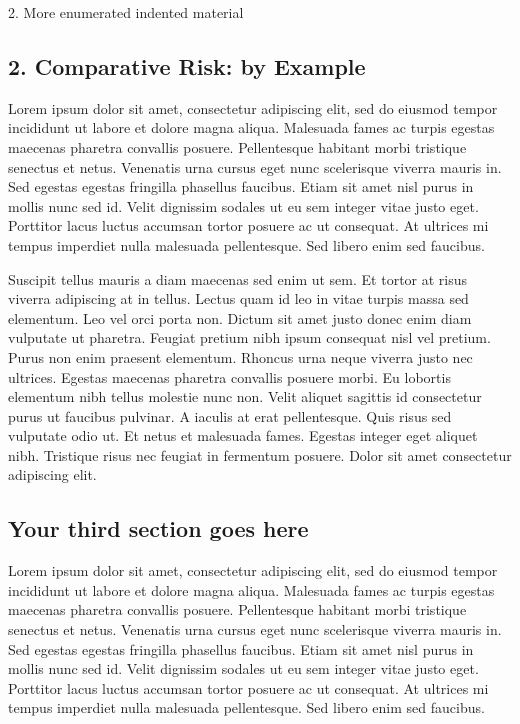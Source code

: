 \documentclass[10pt,oneside,a4paper]{article}
\begin{document}
\begin{multicols}{2}
\begin{description}
\item 2. More enumerated indented material
\end{description}




\subsection*{2. Comparative Risk: by Example}


Lorem ipsum dolor sit amet, consectetur adipiscing elit, sed do eiusmod tempor incididunt ut labore et dolore magna aliqua. Malesuada fames ac turpis egestas maecenas pharetra convallis posuere. Pellentesque habitant morbi tristique senectus et netus. Venenatis urna cursus eget nunc scelerisque viverra mauris in. Sed egestas egestas fringilla phasellus faucibus. Etiam sit amet nisl purus in mollis nunc sed id. Velit dignissim sodales ut eu sem integer vitae justo eget. Porttitor lacus luctus accumsan tortor posuere ac ut consequat. At ultrices mi tempus imperdiet nulla malesuada pellentesque. Sed libero enim sed faucibus.

Suscipit tellus mauris a diam maecenas sed enim ut sem. Et tortor at risus viverra adipiscing at in tellus. Lectus quam id leo in vitae turpis massa sed elementum. Leo vel orci porta non. Dictum sit amet justo donec enim diam vulputate ut pharetra. Feugiat pretium nibh ipsum consequat nisl vel pretium. Purus non enim praesent elementum. Rhoncus urna neque viverra justo nec ultrices. Egestas maecenas pharetra convallis posuere morbi. Eu lobortis elementum nibh tellus molestie nunc non. Velit aliquet sagittis id consectetur purus ut faucibus pulvinar. A iaculis at erat pellentesque. Quis risus sed vulputate odio ut. Et netus et malesuada fames. Egestas integer eget aliquet nibh. Tristique risus nec feugiat in fermentum posuere. Dolor sit amet consectetur adipiscing elit.
\subsection*{Your third section goes here}
Lorem ipsum dolor sit amet, consectetur adipiscing elit, sed do eiusmod tempor incididunt ut labore et dolore magna aliqua. Malesuada fames ac turpis egestas maecenas pharetra convallis posuere. Pellentesque habitant morbi tristique senectus et netus. Venenatis urna cursus eget nunc scelerisque viverra mauris in. Sed egestas egestas fringilla phasellus faucibus. Etiam sit amet nisl purus in mollis nunc sed id. Velit dignissim sodales ut eu sem integer vitae justo eget. Porttitor lacus luctus accumsan tortor posuere ac ut consequat. At ultrices mi tempus imperdiet nulla malesuada pellentesque. Sed libero enim sed faucibus.


\end{multicols}
\end{document}
